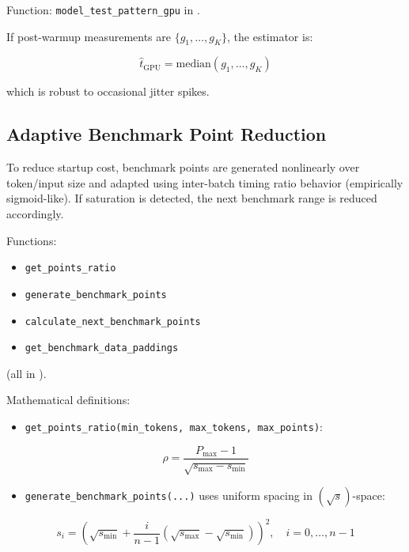 \documentclass{article}
\providecommand{\tightlist}{\setlength{\itemsep}{0pt}\setlength{\parskip}{0pt}}
\begin{document}
Function: \texttt{model\_test\_pattern\_gpu} in
.

If post-warmup measurements are \(\{g_1,\dots,g_K\}\), the
estimator is:

\[
\hat{t}_{\mathrm{GPU}}=\mathrm{median}(g_1,\dots,g_K)
\]

which is robust to occasional jitter spikes.

\hypertarget{53-adaptive-benchmark-point-reduction}{%
\subsection{Adaptive Benchmark Point
Reduction}\label{53-adaptive-benchmark-point-reduction}}

To reduce startup cost, benchmark points are generated nonlinearly over
token/input size and adapted using inter-batch timing ratio behavior
(empirically sigmoid-like). If saturation is detected, the next
benchmark range is reduced accordingly.

Functions:

\begin{itemize}
\tightlist
\item
  \texttt{get\_points\_ratio}
\item
  \texttt{generate\_benchmark\_points}
\item
  \texttt{calculate\_next\_benchmark\_points}
\item
  \texttt{get\_benchmark\_data\_paddings}
\end{itemize}

(all in ).

Mathematical definitions:

\begin{itemize}
\tightlist
\item
  \texttt{get\_points\_ratio(min\_tokens,\ max\_tokens,\ max\_points)}:
\end{itemize}

\begin{equation}
\rho = \frac{P_{\max}-1}{\sqrt{s_{\max}-s_{\min}}}
\end{equation}

\begin{itemize}
\tightlist
\item
  \texttt{generate\_benchmark\_points(...)} uses uniform spacing in
  \((\sqrt{s})\)-space:
\end{itemize}

\begin{equation}
s_i = \left(\sqrt{s_{\min}} + \frac{i}{n-1}(\sqrt{s_{\max}}-\sqrt{s_{\min}})\right)^2,\quad i=0,\dots,n-1
\end{equation}
\end{document}
